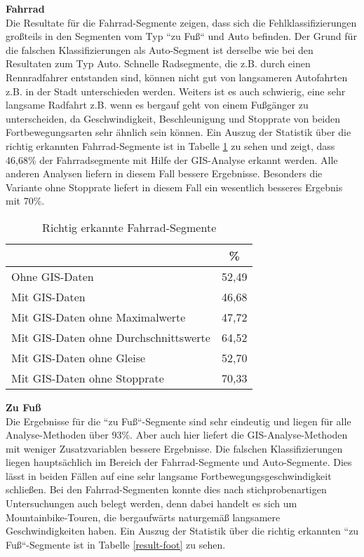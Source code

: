 \textbf{Fahrrad} \\
Die Resultate für die Fahrrad-Segmente zeigen, dass sich die Fehlklassifizierungen großteils in den Segmenten vom Typ ``zu Fuß`` und Auto befinden. Der Grund für die falschen Klassifizierungen als Auto-Segment ist derselbe wie bei den Resultaten zum Typ Auto. Schnelle Radsegmente, die z.B. durch einen Rennradfahrer entstanden sind, können nicht gut von langsameren Autofahrten z.B. in der Stadt unterschieden werden. Weiters ist es auch schwierig, eine sehr langsame Radfahrt z.B. wenn es bergauf geht von einem Fußgänger zu unterscheiden, da Geschwindigkeit, Beschleunigung und Stopprate von beiden Fortbewegungsarten sehr ähnlich sein können. Ein Auszug der Statistik über die richtig erkannten Fahrrad-Segmente ist in Tabelle \ref{result-bike} zu sehen und zeigt, dass 46,68\% der Fahrradsegmente mit Hilfe der GIS-Analyse erkannt werden. Alle anderen Analysen liefern in diesem Fall bessere Ergebnisse. Besonders die Variante ohne Stopprate liefert in diesem Fall ein wesentlich besseres Ergebnis mit 70\%.

\begin{table}[h]
\centering
\begin{tabular}{|l|c|}
\hline
 & \% \\ \hline
Ohne GIS-Daten & 52,49 \\ \hline
Mit GIS-Daten & 46,68 \\ \hline
Mit GIS-Daten ohne Maximalwerte & 47,72 \\ \hline
Mit GIS-Daten ohne Durchschnittswerte & 64,52 \\ \hline
Mit GIS-Daten ohne Gleise & 52,70 \\ \hline
Mit GIS-Daten ohne Stopprate & 70,33 \\ \hline
\end{tabular}
\caption{Richtig erkannte Fahrrad-Segmente}
\label{result-bike}
\end{table}

\textbf{Zu Fuß} \\
Die Ergebnisse für die ``zu Fuß``-Segmente sind sehr eindeutig und liegen für alle Analyse-Methoden über 93\%.  Aber auch hier liefert die GIS-Analyse-Methoden mit weniger Zusatzvariablen bessere Ergebnisse. Die falschen Klassifizierungen liegen hauptsächlich im Bereich der Fahrrad-Segmente und Auto-Segmente. Dies lässt in beiden Fällen auf eine sehr langsame Fortbewegungsgeschwindigkeit schließen. Bei den Fahrrad-Segmenten konnte dies nach stichprobenartigen Untersuchungen auch belegt werden, denn dabei handelt es sich um Mountainbike-Touren, die bergaufwärts naturgemäß langsamere Geschwindigkeiten haben. Ein Auszug der Statistik über die richtig erkannten ``zu Fuß``-Segmente ist in Tabelle \ref{result-foot} zu sehen.

